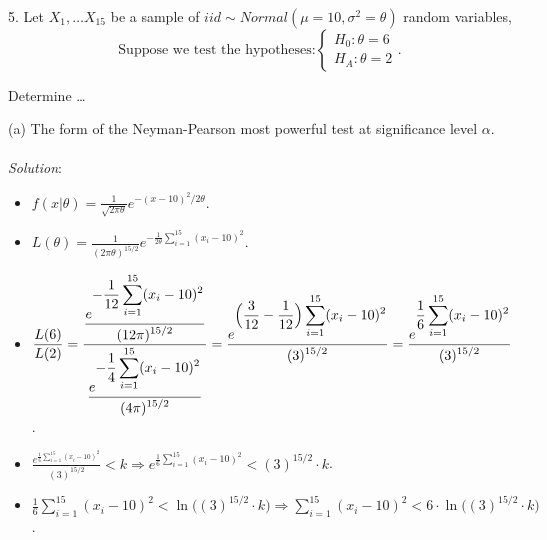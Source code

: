 \documentclass[12pt]{article}
\newcommand{\XB}{\color{black}}
\newcommand{\XBB}{\color{blue}}
\newcommand{\ds}{\displaystyle}
\begin{document}
\vspace{2.5mm}

\newpage
\XBB\hrulefill\XB \\

5. Let $ \ds X_{1}, \dots X_{15} $ be a sample of $ iid \sim Normal(\mu = 10, \sigma^{2} = \theta) $ random variables, \\

\[
    \text{Suppose we test the hypotheses:}
    \left\{
        \begin{array}{rl}
            H_{0} : \theta = 6 \\
            H_{A} : \theta = 2
        \end{array}.
    \right.
\]

Determine \dots \\

\XBB\hrulefill\XB
\vspace{5mm}

(a) The form of the Neyman-Pearson most powerful test at significance level $ \alpha $. \\
\vspace{2.5mm} \\
\textit{Solution}:
\vspace{2.5mm} \\

\begin{itemize}
    \item $ \ds f(x | \theta) = \frac{1}{\ds \sqrt{2\pi\theta}}e^{\ds -(x-10)^{2}/2\theta} $.
    \item $ \ds L(\theta) = \frac{1}{\ds (2\pi\theta)^{15/2}}e^{\ds -\frac{1}{2\theta} \sum_{i=1}^{15} (x_{i}-10)^{2}} $.
    \item $ \ds \frac{L(6)}{L(2)} = \frac{ \ds \frac{ e^{\ds -\frac{1}{12} \sum_{i=1}^{15} (x_{i}-10)^{2}} }{\ds (12\pi)^{15/2}}}{ \ds \frac{e^{\ds -\frac{1}{4} \sum_{i=1}^{15} (x_{i}-10)^{2}}}{\ds (4\pi)^{15/2}} } = \frac{ e^{\ds \Bigl( \frac{3}{12} - \frac{1}{12} \Bigr) \sum_{i=1}^{15} (x_{i}-10)^{2}} }{\ds (3)^{15/2}} = \frac{ e^{\ds \frac{1}{6} \sum_{i=1}^{15} (x_{i}-10)^{2}} }{\ds (3)^{15/2}} $.
    \item $ \ds \frac{ e^{\ds \frac{1}{6} \sum_{i=1}^{15} (x_{i}-10)^{2}} }{\ds (3)^{15/2}} < k \Rightarrow e^{\ds \frac{1}{6} \sum_{i=1}^{15} (x_{i}-10)^{2}} < (3)^{15/2} \cdot k $.
    \item $ \ds \frac{1}{6} \sum_{i=1}^{15} (x_{i}-10)^{2} < \ln \bigl( (3)^{15/2} \cdot k \bigr) \Rightarrow \sum_{i=1}^{15} (x_{i}-10)^{2} < 6 \cdot \ln \bigl( (3)^{15/2} \cdot k \bigr) $.
\end{itemize}
\end{document}

